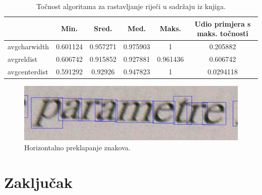 \documentclass[times, utf8, zavrsni]{fer}
\begin{document}
\begin{table}[htb]
\caption{Točnost algoritama za rastavljanje riječi u sadržaju iz knjiga.}
\label{tbl:result-03}
\centering
\begin{tabular}{lccccc} \hline
& Min. & Sred. & Med. & Maks. & Udio primjera s maks. točnosti \\ \hline
avgcharwidth & 0.601124 & 0.957271 & 0.975903 & 1 & 0.205882 \\
avgreldist & 0.606742 & 0.915852 & 0.927881 & 0.961436 & 0.606742 \\
avgcenterdist & 0.591292 & 0.92926 & 0.947823 & 1 & 0.0294118 \\ \hline
\end{tabular}
\end{table}

\begin{figure}[htb]
    \centering
    \captionsetup{justification=centering,margin=2cm}
    \includegraphics[width=\textwidth]{images/error-02.png}
    \caption{
        Horizontalno preklapanje znakova.
    }
    \label{fig:error-02}
\end{figure}

%
%



























\chapter{Zaključak}




\begin{sazetak}

\kljucnerijeci{}
\end{sazetak}

\begin{abstract}

\keywords{}
\end{abstract}
\end{document}
